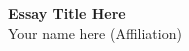 \documentclass[letterpaper, 11pt]{article}
\begin{document}

\begin{center}
\textbf{Essay Title Here} \\
Your name here (Affiliation)\bigskip
\end{center}


\lipsum[1-9]

\end{document}
